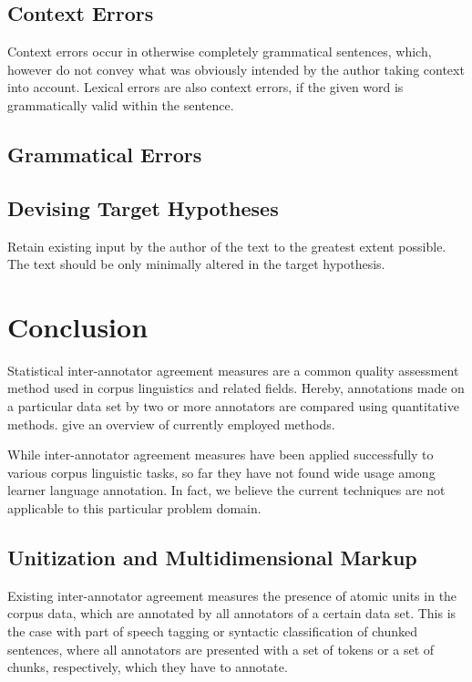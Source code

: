 \documentclass[12pt]{article}
\begin{document}
\subsection{Context Errors}
Context errors occur in otherwise completely grammatical sentences, which, however
do not convey what was obviously intended by the author taking context into
account. Lexical errors are also context errors, if the given word is grammatically
valid within the sentence.

\subsection{Grammatical Errors}

\subsection{Devising Target Hypotheses}
Retain existing input by the author of the text to the greatest extent possible.
The text should be only minimally altered in the target hypothesis.

\section{Conclusion}\label{sec:results}

Statistical inter-annotator agreement  measures are a common quality assessment
method used in corpus linguistics and related fields. Hereby, annotations made
on a particular data set by two or more annotators are compared using
quantitative methods.  \cite{ap2008} give an overview of currently employed
methods.

While inter-annotator agreement measures have been applied successfully to
various corpus linguistic tasks, so far they have not found wide usage among
learner language annotation. In fact, we believe the current techniques  are not
applicable to this particular problem domain.

\subsection{Unitization and Multidimensional Markup}

Existing inter-annotator agreement measures %
the presence of atomic units in the corpus data, which are annotated by all
annotators of a certain data set. This is the case with part of speech tagging
or syntactic classification of chunked sentences, where all annotators are
presented with a set of tokens or a set of chunks, respectively, which they have
to annotate.
\end{document}
